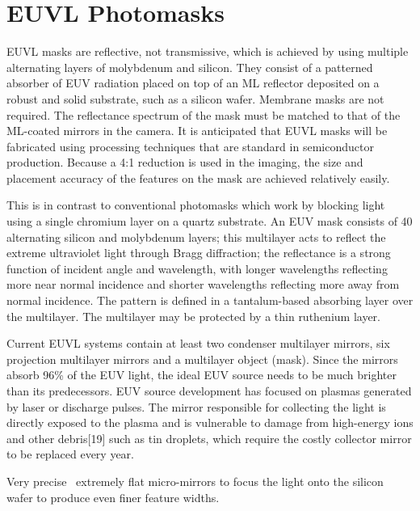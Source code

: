 \documentclass[12pt,a4paper]{report}
\begin{document}
\section{EUVL Photomasks}
EUVL masks are reflective, not transmissive, which is 
achieved by using multiple alternating layers of 
molybdenum and silicon. They consist of a patterned absorber of EUV radiation placed
on top of an ML reflector deposited on a robust and solid
substrate, such as a silicon wafer. Membrane masks are
not required. The reflectance spectrum of the mask must
be matched to that of the ML-coated mirrors in the
camera. It is anticipated that EUVL masks will be
fabricated using processing techniques that are standard
in semiconductor production. Because a 4:1 reduction is
used in the imaging, the size and placement accuracy of
the features on the mask are achieved relatively easily.

This is in contrast to conventional photomasks 
which work by blocking light using a single 
chromium layer on a quartz substrate. An EUV mask 
consists of 40 alternating silicon and molybdenum 
layers; this multilayer acts to reflect the extreme 
ultraviolet light through Bragg diffraction; 
the reflectance is a strong function of incident 
angle and wavelength, with longer wavelengths 
reflecting more near normal incidence and shorter 
wavelengths reflecting more away from normal incidence. 
The pattern is defined in a tantalum-based 
absorbing layer over the multilayer.
 The multilayer 
may be protected by a thin ruthenium layer.


Current EUVL systems contain at least two 
condenser multilayer mirrors, six projection multilayer 
mirrors and a multilayer object (mask). Since 
the mirrors absorb 96\% of the EUV light, the ideal 
EUV source needs to be much brighter than its 
predecessors. EUV source development has focused on 
plasmas generated by laser or discharge pulses. 
The mirror responsible for collecting the light is 
directly exposed to the plasma and is vulnerable 
to damage from high-energy ions and other 
debris[19] such as tin droplets, which require 
the costly collector mirror to be replaced every year.

Very precise  extremely flat micro-mirrors to 
focus the light onto the silicon wafer to 
produce even finer feature widths.



\end{document}
